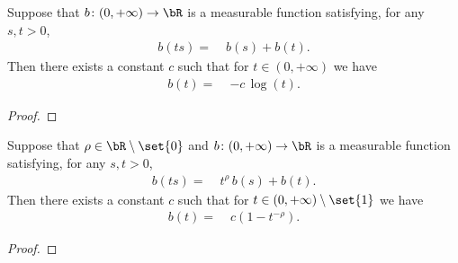 \begin{lemma}[Functional equation translation coefficient solution with $\rho = 0$]
  \label{lem:solution-functional-eqn-translation-no-scaling}
  Suppose that
  $b \colon (0,+\infty) \to \bR$ is a measurable function
  satisfying, for any $s, t > 0$,
  \begin{align*}
    b(t s) = \; & b(s) + b(t) .
  \end{align*}
  Then there exists a constant $c$ such that for $t \in (0,+\infty)$
  we have
  \begin{align*}
    b(t) = \; & -c \, \log (t) .
  \end{align*}
\end{lemma}
\begin{proof}
\end{proof}

\begin{lemma}
  \label{lem:solution-functional-eqn-translation-with-scaling}
  Suppose that $\rho \in \bR \setminus \set{0}$ and
  $b \colon (0,+\infty) \to \bR$ is a measurable function
  satisfying, for any $s, t > 0$,
  \begin{align*}
    b(t s) = \; & t^{\rho} \, b(s) + b(t) .
  \end{align*}
  Then there exists a constant $c$ such that for $t \in (0,+\infty) \setminus \set{1}$
  we have
  \begin{align*}
    b(t) = \; & c (1 - t^{-\rho}) .
  \end{align*}
\end{lemma}
\begin{proof}
\end{proof}

